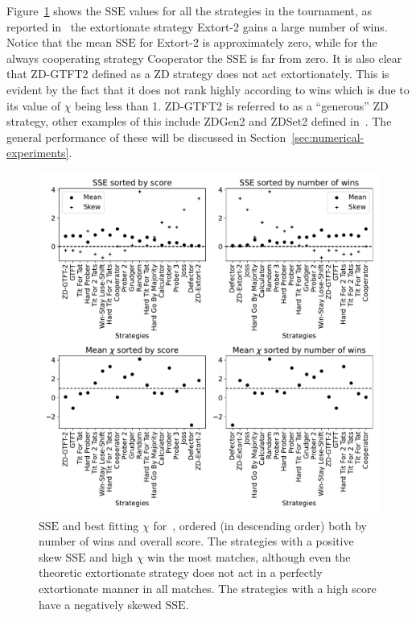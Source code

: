 \documentclass[a4paper]{article}
\newcommand{\SSe}{\text{SSE}}
\begin{document}
Figure~\ref{fig:sserror_in_stewart_plotkin} shows the
\(\SSe\) values for all the strategies in the tournament, as
reported in~\cite{Stewart2012} the extortionate strategy Extort-2 gains a large number of
wins. Notice that the mean \(\SSe\) for Extort-2 is approximately zero, while for
the always cooperating strategy Cooperator the \(\SSe\) is far from zero. It is
also clear that ZD-GTFT2 defined as a ZD strategy does not act
extortionately. This is evident by the fact that it does not rank highly according
to wins which is due to its value of \(\chi\) being less than 1.
ZD-GTFT2 is referred to as a ``generous'' ZD strategy, other examples of this
include ZDGen2 and ZDSet2 defined in~\cite{sep-prisoner-dilemma}. The
general performance of these will be discussed in
Section~\ref{sec:numerical-experiments}.

\begin{figure}[!htbp]
    \centering
    \includegraphics[width=.8\textwidth]{./assets/img/sserror_in_stewart_plotkin/main.pdf}
    \caption{\(\SSe\) and best fitting \(\chi\) for~\cite{Stewart2012},
        ordered (in descending order) both by number of wins and overall score.
        The strategies with a positive skew
        \(\SSe\) and high \(\chi\) win the most matches, although even the
        theoretic
        extortionate strategy does not act in a perfectly extortionate manner in
        all matches. The strategies with a high score have a negatively skewed
        \(\SSe\).
        }
    \label{fig:sserror_in_stewart_plotkin}
\end{figure}
\end{document}

